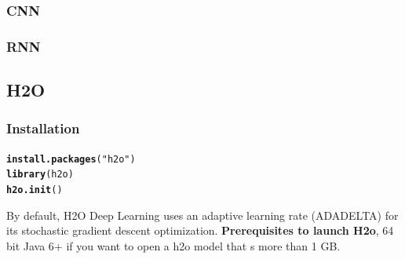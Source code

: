 \documentclass[6pt,letter]{article}\usepackage[]{graphicx}\usepackage[]{color}
\makeatletter
\newcommand{\hlstr}[1]{\textcolor[rgb]{0.192,0.494,0.8}{#1}}%
\newcommand{\hlstd}[1]{\textcolor[rgb]{0.345,0.345,0.345}{#1}}%
\newcommand{\hlkwd}[1]{\textcolor[rgb]{0.737,0.353,0.396}{\textbf{#1}}}%
\newenvironment{kframe}{%
 \def\at@end@of@kframe{}%
 \ifinner\ifhmode%
  \def\at@end@of@kframe{\end{minipage}}%
  \begin{minipage}{\columnwidth}%
 \fi\fi%
 \def\FrameCommand##1{\hskip\@totalleftmargin \hskip-\fboxsep
 \colorbox{shadecolor}{##1}\hskip-\fboxsep
     \hskip-\linewidth \hskip-\@totalleftmargin \hskip\columnwidth}%
 \MakeFramed {\advance\hsize-\width
   \@totalleftmargin\z@ \linewidth\hsize
   \@setminipage}}%
 {\par\unskip\endMakeFramed%
 \at@end@of@kframe}
\newenvironment{knitrout}{}{} %
\makeatother
\begin{document}
\subsubsection{CNN}
\subsubsection{RNN}

\subsection{H2O}
\subsubsection{Installation}
\begin{knitrout}
\color{fgcolor}\begin{kframe}
\begin{alltt}
\hlkwd{install.packages}\hlstd{(}\hlstr{"h2o"}\hlstd{)}
\hlkwd{library}\hlstd{(h2o)}
\hlkwd{h2o.init}\hlstd{()}
\end{alltt}
\end{kframe}
\end{knitrout}
By default, H2O Deep Learning uses an adaptive learning rate (ADADELTA) for its stochastic gradient descent optimization.
\textbf{Prerequisites to launch H2o}, 64 bit Java 6+ if you want to open a h2o model that s more than 1 GB. 
\end{document}
